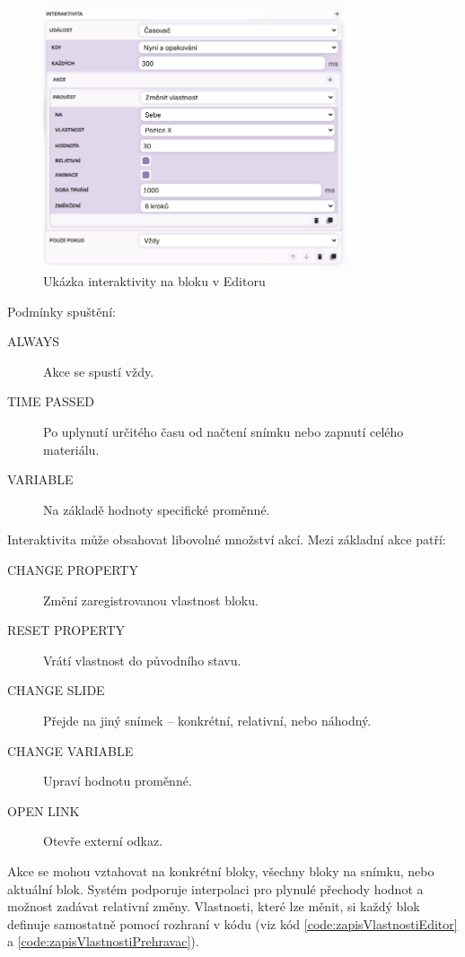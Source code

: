 \begin{figure}[ht!]
    \centering
    \includegraphics[width=0.8\textwidth]{media/05_realizace/interaktivita.png}
    \caption{Ukázka interaktivity na bloku v Editoru}
    \label{fig:interaktivita}
\end{figure}


Podmínky spuštění:
\begin{description}
  \item[ALWAYS] Akce se spustí vždy.
  \item[TIME PASSED] Po uplynutí určitého času od načtení snímku nebo zapnutí celého materiálu.
  \item[VARIABLE] Na základě hodnoty specifické proměnné.
\end{description}

Interaktivita může obsahovat libovolné množství akcí. Mezi základní akce patří:

\begin{description}
  \item[CHANGE PROPERTY] Změní zaregistrovanou vlastnost bloku.
  \item[RESET PROPERTY] Vrátí vlastnost do původního stavu.
  \item[CHANGE SLIDE] Přejde na jiný snímek – konkrétní, relativní, nebo náhodný.
  \item[CHANGE VARIABLE] Upraví hodnotu proměnné.
  \item[OPEN LINK] Otevře externí odkaz.
\end{description}

Akce se mohou vztahovat na konkrétní bloky, všechny bloky na snímku, nebo aktuální blok. 
Systém podporuje interpolaci pro plynulé přechody hodnot a možnost zadávat relativní změny.
Vlastnosti, které lze měnit, si každý blok definuje samostatně pomocí rozhraní v kódu (viz kód \ref{code:zapisVlastnostiEditor} a \ref{code:zapisVlastnostiPrehravac}).

